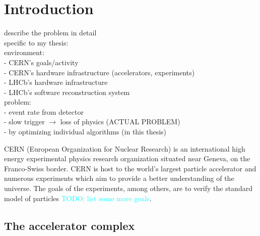 \documentclass[12pt]{article}
\begin{document}
	
	\newpage
	\section{Introduction}
	
	\color{red}
	describe the problem in detail \\
	specific to my thesis: \\
	environment: \\
	- CERN's goals/activity \\
	- CERN's hardware infrastructure (accelerators, experiments) \\
	- LHCb's hardware infrastructure \\
	- LHCb's software reconstruction system \\
	problem: \\
	- event rate from detector \\
	- slow trigger $\rightarrow$ loss of physics (ACTUAL PROBLEM) \\
	- by optimizing individual algorithms (in this thesis) \\
	\color{black}
	\vspace{1.5pc}
	
	CERN (European Organization for Nuclear Research) is an international high energy experimental physics research organization situated near Geneva, on the Franco-Swiss border. CERN is host to the world's largest particle accelerator and numerous experiments which aim to provide a better understanding of the universe. The goals of the experiments, among others, are to verify the standard model of particles \textcolor{cyan}{TODO: list some more goals}.
	\cite{cern_about}
	
	
	\subsection{The accelerator complex \cite{cern_accel_complex}}
	
\end{document}
